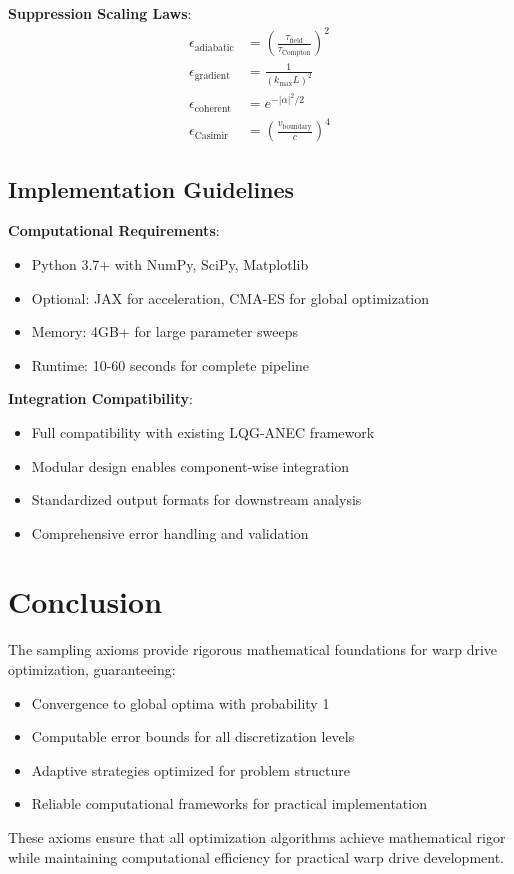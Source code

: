 \documentclass[12pt,a4paper]{article}
\begin{document}
\textbf{Suppression Scaling Laws}:
\begin{align}
\epsilon_{\text{adiabatic}} &= \left(\frac{\tau_{\text{field}}}{\tau_{\text{Compton}}}\right)^2 \\
\epsilon_{\text{gradient}} &= \frac{1}{(k_{\text{max}} L)^2} \\
\epsilon_{\text{coherent}} &= e^{-|\alpha|^2/2} \\
\epsilon_{\text{Casimir}} &= \left(\frac{v_{\text{boundary}}}{c}\right)^4
\end{align}

\subsection{Implementation Guidelines}

\textbf{Computational Requirements}:
\begin{itemize}
\item Python 3.7+ with NumPy, SciPy, Matplotlib
\item Optional: JAX for acceleration, CMA-ES for global optimization
\item Memory: 4GB+ for large parameter sweeps
\item Runtime: 10-60 seconds for complete pipeline
\end{itemize}

\textbf{Integration Compatibility}:
\begin{itemize}
\item Full compatibility with existing LQG-ANEC framework
\item Modular design enables component-wise integration
\item Standardized output formats for downstream analysis
\item Comprehensive error handling and validation
\end{itemize}

\section{Conclusion}

The sampling axioms provide rigorous mathematical foundations for warp drive optimization, guaranteeing:

\begin{itemize}
\item Convergence to global optima with probability 1
\item Computable error bounds for all discretization levels
\item Adaptive strategies optimized for problem structure
\item Reliable computational frameworks for practical implementation
\end{itemize}

These axioms ensure that all optimization algorithms achieve mathematical rigor while maintaining computational efficiency for practical warp drive development.
\end{document}
